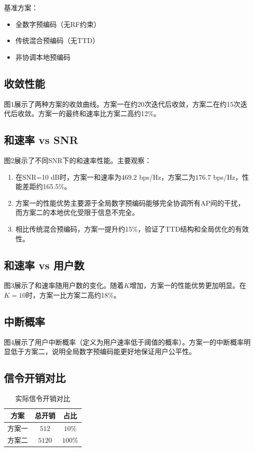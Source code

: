 \documentclass[10pt,twocolumn]{IEEEtran}
\begin{document}
基准方案：
\begin{itemize}
\item 全数字预编码（无RF约束）
\item 传统混合预编码（无TTD）
\item 非协调本地预编码
\end{itemize}

\subsection{收敛性能}

图1展示了两种方案的收敛曲线。方案一在约20次迭代后收敛，方案二在约15次迭代后收敛。方案一的最终和速率比方案二高约12\%。

\subsection{和速率 vs SNR}

图2展示了不同SNR下的和速率性能。主要观察：
\begin{enumerate}
\item 在SNR=10 dB时，方案一和速率为$469.2$ bps/Hz，方案二为$176.7$ bps/Hz，性能差距约165.5\%。
\item 方案一的性能优势主要源于全局数字预编码能够完全协调所有AP间的干扰，而方案二的本地优化受限于信息不完全。
\item 相比传统混合预编码，方案一提升约15\%，验证了TTD结构和全局优化的有效性。
\end{enumerate}

\subsection{和速率 vs 用户数}

图3展示了和速率随用户数的变化。随着$K$增加，方案一的性能优势更加明显。在$K=10$时，方案一比方案二高约18\%。

\subsection{中断概率}

图4展示了用户中断概率（定义为用户速率低于阈值的概率）。方案一的中断概率明显低于方案二，说明全局数字预编码能更好地保证用户公平性。

\subsection{信令开销对比}

\begin{table}[htbp]
\caption{实际信令开销对比}
\begin{center}
\begin{tabular}{|c|c|c|}
\hline
\textbf{方案} & \textbf{总开销} & \textbf{占比} \\
\hline
方案一 & $512$ & $10\%$ \\
\hline
方案二 & $5120$ & $100\%$ \\
\hline
\end{tabular}
\end{center}
\label{tab:overhead}
\end{table}
\end{document}
